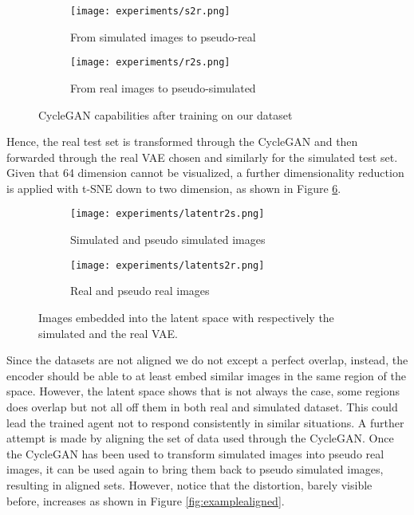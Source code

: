 \begin{figure}[h]
  \centering
  \begin{subfigure}{.6\linewidth}
      \centering
      \texttt{[image: experiments/s2r.png]}
      \caption{From simulated images to pseudo-real}\label{fig:s2r}
  \end{subfigure}
      \hfill
  \begin{subfigure}{.6\linewidth}
      \centering
      \texttt{[image: experiments/r2s.png]}
      \caption{From real images to pseudo-simulated}\label{fig:r2s}
  \end{subfigure}
  \caption{CycleGAN capabilities after training on our dataset}
  \label{fig:cycleganexample}
\end{figure}
Hence, the real test set is transformed through the CycleGAN and then forwarded through the real VAE chosen and similarly for the simulated test set. Given that 64 dimension cannot be visualized, a further dimensionality reduction is applied with t-SNE down to two dimension, as shown in Figure \ref{fig:latentpseudo}.
\begin{figure}[h]
  \centering
  \begin{subfigure}{.5\linewidth}
      \centering
      \texttt{[image: experiments/latentr2s.png]}
      \caption{Simulated and pseudo simulated images}\label{fig:latentr2s}
  \end{subfigure}%
      \hfill
  \begin{subfigure}{.5\linewidth}
      \centering
      \texttt{[image: experiments/latents2r.png]}
      \caption{Real and pseudo real images}\label{fig:latents2r}
  \end{subfigure}
  \caption{Images embedded into the latent space with respectively the simulated and the real VAE.}
  \label{fig:latentpseudo}
\end{figure}
Since the datasets are not aligned we do not except a perfect overlap, instead, the encoder should be able to at least embed similar images in the same region of the space. However, the latent space shows that is not always the case, some regions does overlap but not all off them in both real and simulated dataset. This could lead the trained agent not to respond consistently in similar situations. A further attempt is made by aligning the set of data used through the CycleGAN. Once the CycleGAN has been used to transform simulated images into pseudo real images, it can be used again to bring them back to pseudo simulated images, resulting in aligned sets. However, notice that the distortion, barely visible before, increases as shown in Figure \ref{fig:examplealigned}.

